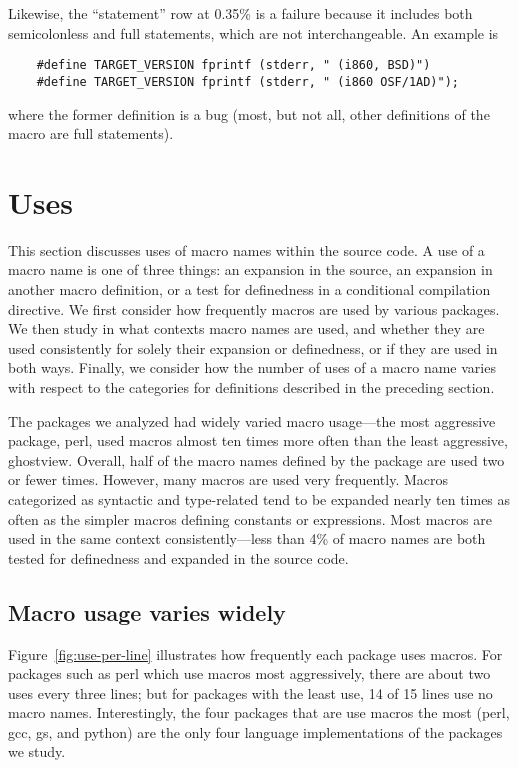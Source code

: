 \documentclass[10pt]{article}
\newcommand{\pkg}[1]{\textsf{#1}}
\begin{document}
Likewise, the ``statement'' row at 0.35\% is a failure because it includes
both semicolonless and full statements, which are not interchangeable.  An
example is
\begin{verbatim}
    #define TARGET_VERSION fprintf (stderr, " (i860, BSD)")
    #define TARGET_VERSION fprintf (stderr, " (i860 OSF/1AD)");
\end{verbatim}
where the former definition is a bug (most, but not all, other definitions
of the macro are full statements).




\section{Uses}

This section discusses uses of macro names within the source code.  A
use of a macro name is one of three things: an expansion in the source,
an expansion in another macro definition, or a test for definedness in a
conditional compilation directive.  We first consider how frequently
macros are used by various packages.  We then study in what contexts
macro names are used, and whether they are used consistently for solely
their expansion or definedness, or if they are used in both ways.
Finally, we consider how the number of uses of a macro name varies with
respect to the categories for definitions described in the preceding
section.

The packages we analyzed had widely varied macro usage---the most
aggressive package, \pkg{perl}, used macros almost ten times more often
than the least aggressive, \pkg{ghostview}.  Overall, half of the macro
names defined by the package are used two or fewer times.  However, many
macros are used very frequently.  Macros categorized as syntactic and
type-related tend to be expanded nearly ten times as often as the
simpler macros defining constants or expressions.  Most macros are used
in the same context consistently---less than 4\% of macro names are both
tested for definedness and expanded in the source code.

\subsection{Macro usage varies widely}

Figure~\ref{fig:use-per-line} illustrates how frequently each package
uses macros.  For packages such as \pkg{perl} which use macros most
aggressively, there are about two uses every three lines;  but for
packages with the least use, 14 of 15 lines use no macro names.
Interestingly, the four packages that are use macros the most
(\pkg{perl}, \pkg{gcc}, \pkg{gs}, and \pkg{python}) are the
only four language implementations of the packages we study.
\end{document}
